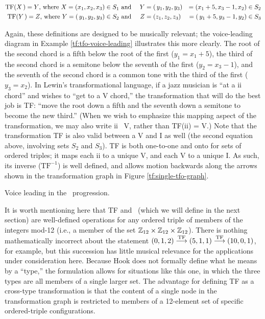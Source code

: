 \documentclass[diss]{subfiles}
\begin{document}
\vspace{-3em} %
\begin{alignat*}{3}
    \mathrm{TF}(X\text{\thinspace}) = Y\text{, where}\ X = (x_1, x_2, x_3) \in S_1
    & \text{ and}\ &
    Y &= (\text{\thinspace}y_1, y_2, y_3) &= (x_1 + 5, x_3 - 1, x_2) \in S_2 \\
    \mathrm{TF}(Y\text{\thinspace}) = Z\text{, where}\ Y =
    (\text{\thinspace}y_1, y_2, y_3) \in S_2
    & \text{ and} &
    Z &= (z_1, z_2, z_3) &= (\text{\thinspace}y_1 + 5, y_3 - 1, y_2) \in
    S_3
\end{alignat*}
\vspace{-3em}

\noindent Again, these definitions are designed to be musically relevant; the
voice-leading diagram in Example \ref{tf:tfo-voice-leading} illustrates this
more clearly. The root of the second chord is a fifth below the root of the
first ($y_1 = x_1 + 5$), the third of the second chord is a semitone below the
seventh of the first ($y_2 = x_3 - 1$), and the seventh of the second chord is
a common tone with the third of the first ($y_3 = x_2$). In Lewin's
transformational language, if a jazz musician is ``at a ii chord'' and
wishes to ``get to a V chord,'' the transformation that will do the
best job is TF: ``move the root down a fifth and the seventh down a semitone
to become the new third.'' (When we wish to emphasize this mapping
aspect of the transformation, we may also write ii
\TFarrow\ V, rather than TF(ii) = V.)
Note that the transformation TF is also valid
between a V and I as well (the second equation above,
involving sets $S_2$ and $S_3$). TF is both one-to-one and onto for sets of
ordered triples; it maps each ii to a unique V, and each
V to a unique I. As such, its inverse ($\mathrm{TF}^{-1}$) is
well defined, and allows motion backwards along the arrows shown in the
transformation graph in Figure \ref{tf:single-tfo-graph}.

\exBeg[htbp]
  \caption{Voice leading in the \tfo\ progression.}
  \label{tf:tfo-voice-leading}
\exEnd

It is worth mentioning here that TF and \tft\ (which we will define in the
next section) are well-defined operations for any ordered triple of members of
the integers mod-12 (i.e., a member of the set $\mathbb{Z}_{12} \times \mathbb{Z}_{12}
\times \mathbb{Z}_{12}$). There is nothing mathematically incorrect
about the statement $(0, 1, 2) \overset{\mathrm{TF}}{\longrightarrow} (5, 1, 1) \overset{\mathrm{TF}}{\longrightarrow} (10, 0, 1)$, for
example, but this succession has little musical relevance for the applications
under consideration here. Because Hook does not formally define what he means
by a ``type,'' the formulation allows for situations like this one, in which
the three types are all members of a single larger set. The advantage
for defining TF as a cross-type transformation is that the content of a single
node in the transformation graph is restricted to members of a 12-element set
of specific ordered-triple configurations.
\end{document}
